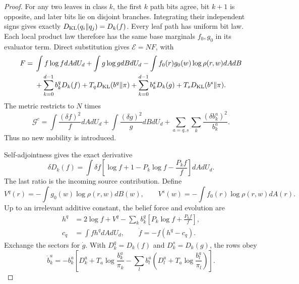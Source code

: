 \begin{proof}
For any two leaves in class $k$, the first $k$ path bits agree, bit $k+1$ is opposite, and later bits lie on disjoint branches. Integrating their independent signs gives exactly $D_{\mathrm{KL}}(q_i\Vert q_j)=D_k(f)$. Every leaf path has uniform bit law. Each local product law therefore has the same base marginals $f_0,g_0$ in its evaluator term. Direct substitution gives $\mathcal E=NF$, with
\begin{equation}
 \begin{aligned}
 F={}&\int f\log f dA dU_d+\int g\log g dB dU_d
       -\int f_0(r)g_0(w)\log\rho(r,w) dA dB\\
 &+\sum_{k=0}^{d-1}b_k^qD_k(f)+T_qD_{\mathrm{KL}}(b^q\Vert\pi)
  +\sum_{k=0}^{d-1}b_k^sD_k(g)+T_sD_{\mathrm{KL}}(b^s\Vert\pi).
 \end{aligned}
 \label{eq:boundary-tree-energy}
\end{equation}
The metric restricts to $N$ times
\begin{equation}
 \mathcal G^c=\int\frac{(\delta f)^2}{f} dA dU_d
       +\int\frac{(\delta g)^2}{g} dB dU_d
       +\sum_{a=q,s}\sum_k\frac{(\delta b_k^a)^2}{b_k^a}.
 \label{eq:boundary-tree-metric}
\end{equation}
Thus no new mobility is introduced.

Self-adjointness gives the exact derivative
\begin{equation}
 \delta D_k(f)=\int\delta f
 \left[\log f+1-P_k\log f-\frac{P_k f}{f}\right]dA dU_d.
 \label{eq:boundary-class-variation}
\end{equation}
The last ratio is the incoming source contribution. Define
\begin{equation}
 V^q(r)=-\int g_0(w)\log\rho(r,w) dB(w),\qquad
 V^s(w)=-\int f_0(r)\log\rho(r,w) dA(r).
 \label{eq:boundary-tree-local}
\end{equation}
Up to an irrelevant additive constant, the belief force and evolution are
\begin{equation}
 \begin{aligned}
 h^q&=2\log f+V^q-\sum_kb_k^q\left[P_k\log f+\frac{P_kf}{f}\right],\\
 c_q&=\int fh^q dA dU_d,\qquad
 \dot f=-f(h^q-c_q).
 \end{aligned}
 \label{eq:boundary-tree-flow}
\end{equation}
Exchange the sectors for $\dot g$. With $D_k^q=D_k(f)$ and $D_k^s=D_k(g)$, the rows obey
\begin{equation}
 \dot b_k^a=-b_k^a\left[
 D_k^a+T_a\log\frac{b_k^a}{\pi_k}
 -\sum_l b_l^a\left(D_l^a+T_a\log\frac{b_l^a}{\pi_l}\right)\right].
 \label{eq:boundary-tree-rows}
\end{equation}


\end{proof}
